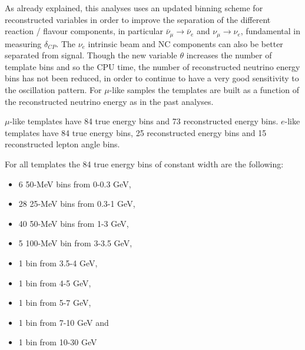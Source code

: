 
As already explained, this analyses uses an updated binning scheme for reconstructed variables
in order to improve the separation of the different reaction / flavour components,
in particular $\bar{\nu}_{\mu} \rightarrow \bar{\nu}_e$ and $\nu_{\mu} \rightarrow \nu_e$,
fundamental in measuring $\delta_{CP}$.
The $\nu_e$ intrinsic beam and NC components can also be better separated from signal.
Though the new variable $\theta$ increases the number of template bins and so the CPU time,
the number of reconstructed neutrino energy bins has not been reduced,
in order to continue to have a very good sensitivity to the oscillation pattern.
For $\mu$-like samples the templates are built as a function of the reconstructed neutrino energy
as in the past analyses.

$\mu$-like templates have 84 true energy bins and 73 reconstructed energy bins. $e$-like templates
have 84 true energy bins, 25 reconstructed energy bins and 15 reconstructed lepton angle bins.

For all templates the 84 true energy bins of constant width are the following:
\begin{itemize}
 \item   6 50-MeV bins from 0-0.3 GeV, 
 \item 28 25-MeV bins from 0.3-1 GeV,
 \item 40 50-MeV bins from 1-3 GeV,
 \item 5 100-MeV bin from 3-3.5 GeV,
 \item 1 bin from 3.5-4 GeV,
 \item 1 bin from 4-5 GeV,
 \item 1 bin from 5-7 GeV,
 \item 1 bin from 7-10 GeV and 
 \item 1 bin from 10-30 GeV
\end{itemize}


